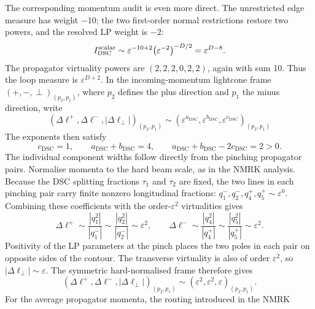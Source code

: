 \documentclass[a4paper,11pt]{article}
\begin{document}
The corresponding momentum audit is even more direct.  The unrestricted
edge measure has weight \(-10\); the two first-order normal restrictions
restore two powers, and the resolved LP weight is \(-2\):
\begin{equation}
 I_{\mathrm{DSC}}^{\rm scalar}\sim
 \varepsilon^{-10+2}\bigl(\varepsilon^{-2}\bigr)^{-D/2}
 =\varepsilon^{D-8}.
 \label{eq:dsc-one-loop-parameter-power}
\end{equation}
The propagator virtuality powers are
\((2,2,2,0,2,2)\), again with sum 10.  Thus the loop measure is
\(\varepsilon^{D+2}\).  In the incoming-momentum lightcone frame
\((+,-,\perp)_{(p_2,p_1)}\), where \(p_2\) defines the plus direction and
\(p_1\) the minus direction, write
\[
 (\Delta\ell^+,\Delta\ell^-,|\Delta\ell_\perp|)_{(p_2,p_1)}\sim
 (\varepsilon^{a_{\mathrm{DSC}}},\varepsilon^{b_{\mathrm{DSC}}},
  \varepsilon^{c_{\mathrm{DSC}}})_{(p_2,p_1)}
\]
The exponents then satisfy
\begin{equation}
 c_{\mathrm{DSC}}=1,\qquad
 a_{\mathrm{DSC}}+b_{\mathrm{DSC}}=4,\qquad
 a_{\mathrm{DSC}}+b_{\mathrm{DSC}}-2c_{\mathrm{DSC}}=2>0.
 \label{eq:dsc-one-loop-glauber-width}
\end{equation}
The individual component widths follow directly from the pinching propagator
pairs.  Normalise momenta to the hard beam scale, as in the NMRK analysis.
Because the DSC splitting fractions \(\tau_1\) and \(\tau_2\) are fixed, the
two lines in each pinching pair carry finite nonzero longitudinal fractions:
\(q_1^-,q_2^-,q_4^+,q_5^+\sim\varepsilon^0\).  Combining these coefficients
with the order-\(\varepsilon^2\) virtualities gives
\begin{equation}
 \Delta\ell^+\sim
 \frac{|q_1^2|}{|q_1^-|}\sim
 \frac{|q_2^2|}{|q_2^-|}\sim\varepsilon^2,
 \qquad
 \Delta\ell^-\sim
 \frac{|q_4^2|}{|q_4^+|}\sim
 \frac{|q_5^2|}{|q_5^+|}\sim\varepsilon^2.
 \label{eq:dsc-longitudinal-pole-widths}
\end{equation}
Positivity of the LP parameters at the pinch places the two poles in each
pair on opposite sides of the contour.  The transverse virtuality is also of
order \(\varepsilon^2\), so
\(|\Delta\ell_\perp|\sim\varepsilon\).  The symmetric hard-normalised frame
therefore gives
\begin{equation}
 (\Delta\ell^+,\Delta\ell^-,|\Delta\ell_\perp|)_{(p_2,p_1)}
 \sim(\varepsilon^2,\varepsilon^2,\varepsilon)_{(p_2,p_1)}.
 \label{eq:dsc-direct-pole-widths}
\end{equation}
For the average propagator momenta, the routing introduced in the NMRK
\end{document}
